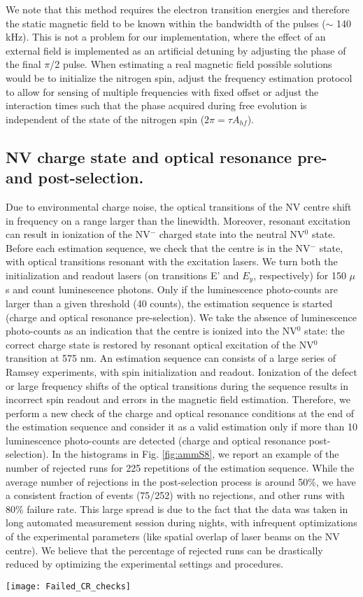 We note that this method requires the electron transition energies and therefore the static magnetic field to be known within the bandwidth of the pulses ($\sim$ 140 kHz). This is not a problem for our implementation, where the effect of an external field is implemented as an artificial detuning by adjusting the phase of the final $\pi$/2 pulse. When estimating a real magnetic field possible solutions would be to initialize the nitrogen spin, adjust the frequency estimation protocol to allow for sensing of multiple frequencies with fixed offset or adjust the interaction times such that the phase acquired during free evolution is independent of the state of the nitrogen spin ($2 \pi = \tau A_{hf}$).

\subsection{NV charge state and optical resonance pre- and post-selection.}
\label{sec:ammCR}
Due to environmental charge noise, the optical transitions of the NV centre shift in frequency on a range larger than the linewidth. Moreover, resonant excitation can result in ionization of the NV$^-$ charged state into the neutral NV$^0$ state.
Before each estimation sequence, we check that the centre is in the NV$^-$ state, with optical transitions resonant with the excitation lasers. We turn both the initialization and readout lasers (on transitions E’ and $E_y$, respectively) for 150 $\mu$s and count luminescence photons. Only if the luminescence photo-counts are larger than a given threshold (40 counts), the estimation sequence is started (charge and optical resonance pre-selection). We take the absence of luminescence photo-counts as an indication that the centre is ionized into the NV$^0$ state: the correct charge state is restored by resonant optical excitation of the NV$^0$ transition at 575 nm.
An estimation sequence can consists of a large series of Ramsey experiments, with spin initialization and readout. Ionization of the defect or large frequency shifts of the optical transitions during the sequence results in incorrect spin readout and errors in the magnetic field estimation. Therefore, we perform a new check of the charge and optical resonance conditions at the end of the estimation sequence and consider it as a valid estimation only if more than 10 luminescence photo-counts are detected (charge and optical resonance post-selection).
In the histograms in Fig. \ref{fig:ammS8}, we report an example of the number of rejected runs for 225 repetitions of the estimation sequence. While the average number of rejections in the post-selection process is around 50\%, we have a consistent fraction of events (75/252) with no rejections, and other runs with 80\% failure rate. This large spread is due to the fact that the data was taken in long automated measurement session during nights, with infrequent optimizations of the experimental parameters (like spatial overlap of laser beams on the NV centre). We believe that the percentage of rejected runs can be drastically reduced by optimizing the experimental settings and procedures.
\begin{figure*}
	\centering
	\texttt{[image: Failed\_CR\_checks]}
	\caption{\label{fig:ammS8} \textbf{Charge resonance statistics.} Histograms of the percentage of rejected runs in charge and optical resonance post-selection.}
\end{figure*}



